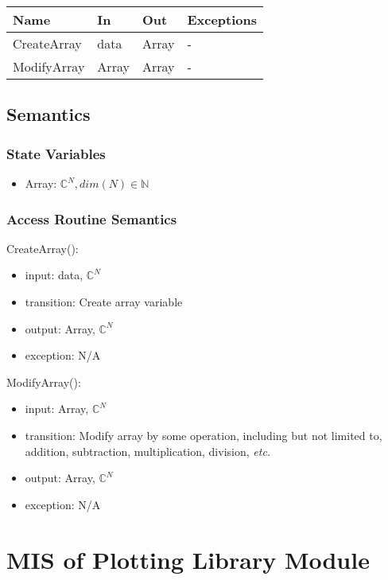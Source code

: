 \documentclass[12pt, titlepage]{article}
\begin{document}
\begin{center}
\begin{tabular}{p{2cm} p{4cm} p{4cm} p{2cm}}
\hline
\textbf{Name} & \textbf{In} & \textbf{Out} & \textbf{Exceptions} \\
\hline
CreateArray & data & Array & - \\
ModifyArray & Array & Array & - \\
\hline
\end{tabular}
\end{center}

\subsection{Semantics}

\subsubsection{State Variables}
\begin{itemize}
    \item Array: $\mathbb{C}^N, dim(N) \in \mathbb{N}$
\end{itemize}

\subsubsection{Access Routine Semantics}

\noindent CreateArray():
\begin{itemize}
    \item input: data, $\mathbb{C}^N$
    \item transition: Create array variable
    \item output: Array, $\mathbb{C}^N$
    \item exception: N/A
\end{itemize}

\noindent ModifyArray():
\begin{itemize}
    \item input: Array, $\mathbb{C}^N$
    \item transition: Modify array by some operation, including but not limited to, addition, subtraction, multiplication, division, \textit{etc.}
    \item output: Array, $\mathbb{C}^N$
    \item exception: N/A
\end{itemize}

\section{MIS of Plotting Library Module} \label{Mod:Plotting}
\end{document}
